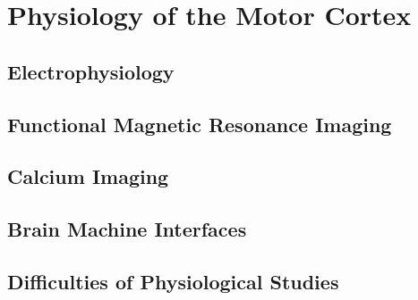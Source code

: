 \section{Physiology of the Motor Cortex}

\subsection{Electrophysiology}

\subsection{Functional Magnetic Resonance Imaging}

\subsection{Calcium Imaging}

\subsection{Brain Machine Interfaces}

\subsection{Difficulties of Physiological Studies}